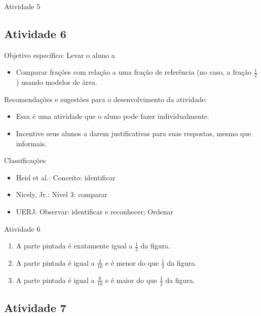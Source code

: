 \documentclass[oneside]{book}
\begin{document}
\begin{multicols}{2}
\begin{resposta*}{Atividade 5}
\end{resposta*}

\subsection{Atividade 6}

  Objetivo específico: Levar o aluno a
\begin{itemize} %
    \item       Comparar frações com relação a uma fração de referência (no caso, a fração       $\frac{1}{2}$      ) usando modelos de área.
\end{itemize} %


  Recomendações e sugestões para o desenvolvimento da atividade:
\begin{itemize} %
    \item       Essa é uma atividade que o aluno pode fazer individualmente.
    \item       Incentive seus alunos a darem justificativas para suas respostas, mesmo que informais.
\end{itemize} %


  Classificações
\begin{itemize} %
    \item       Heid et al.: Conceito: identificar
    \item       Nicely, Jr.: Nível 3: comparar
    \item       UERJ: Observar: identificar e reconhecer; Ordenar
\end{itemize} %

\begin{resposta*}{Atividade 6}
\begin{enumerate} [\quad a)] %
    \item       A parte pintada é exatamente igual a       $\frac{1}{2}$       da figura.
    \item       A parte pintada é igual a       $\frac{4}{10}$       e é menor do que       $\frac{1}{2}$       da figura.
    \item       A parte pintada é igual a       $\frac{6}{10}$       e é maior do que       $\frac{1}{2}$       da figura.
\end{enumerate} %

\end{resposta*}

\subsection{Atividade 7}


\end{multicols}
\end{document}
